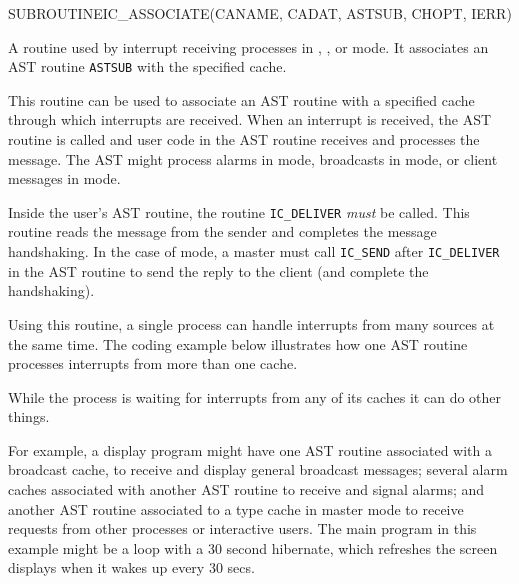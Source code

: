 \begin{routine} %
\subroutine
   {SUBROUTINE}{IC\_ASSOCIATE}{(CANAME, CADAT, ASTSUB, CHOPT, IERR)}
\begin{overview}
A routine used by interrupt receiving processes in \broadcast,
\alarm, or \mailbox mode. It associates an AST routine \verb|ASTSUB|
with the specified cache.

\end{overview}
\begin{argdeflist}
\end{argdeflist}
\begin{describe}

This routine can be used to associate an AST routine with a specified
cache through which interrupts are received. When an interrupt is
received, the AST routine is called and user code in the AST routine
receives and processes the message. The AST might process
alarms in \alarm mode, broadcasts in \broadcast mode, or client messages
in \mailbox mode.

Inside the user's AST routine, the routine \verb|IC_DELIVER| {\em must} be
called. This routine reads the message from the sender and completes
the message handshaking. In the case of \mailbox mode, a master must call
\verb|IC_SEND| after \verb|IC_DELIVER| in the AST routine to send the
reply to the client (and complete the handshaking).

Using this routine, a single process can handle interrupts from many
sources at the same time. The coding example below illustrates how
one AST routine processes interrupts from more than one cache.

While the process is waiting for interrupts
from any of its caches it can do other things.

For example, a display program might have one AST routine associated with
a broadcast cache, to receive and display general broadcast messages;
several alarm caches associated with another AST routine to receive and
signal alarms; and another AST routine associated to
a \mailbox type cache in master mode to receive requests from other
processes or interactive users. The main program in this example might
be a loop with a 30 second hibernate, which refreshes the
screen displays when it wakes up every 30 secs.


\end{describe}
\end{routine}
